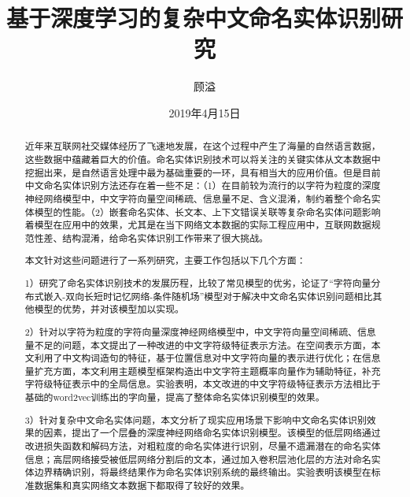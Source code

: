 \documentclass[winfonts,master,oneside,nobackinfo]{njuthesis}
\title{基于深度学习的复杂中文命名实体识别研究}
\author{顾溢}
\institute{南京大学}
\date{2019年4月15日}
\begin{document}

\maketitle
\makeenglishtitle



\begin{abstract}

近年来互联网社交媒体经历了飞速地发展，在这个过程中产生了海量的自然语言数据，这些数据中蕴藏着巨大的价值。命名实体识别技术可以将关注的关键实体从文本数据中挖掘出来，是自然语言处理中最为基础重要的一环，具有相当大的应用价值。但是目前中文命名实体识别方法还存在着一些不足：（1）在目前较为流行的以字符为粒度的深度神经网络模型中，中文字符向量空间稀疏、信息量不足、含义混淆，制约着整个命名实体模型的性能。（2）嵌套命名实体、长文本、上下文错误关联等复杂命名实体问题影响着模型在应用中的效果，尤其是在当下网络文本数据的实际工程应用中，互联网数据规范性差、结构混淆，给命名实体识别工作带来了很大挑战。

本文针对这些问题进行了一系列研究，主要工作包括以下几个方面：

1）研究了命名实体识别技术的发展历程，比较了常见模型的优劣，论证了“字符向量分布式嵌入-双向长短时记忆网络-条件随机场”模型对于解决中文命名实体识别问题相比其他模型的优势，并对该模型加以实现。

2）针对以字符为粒度的字符向量深度神经网络模型中，中文字符向量空间稀疏、信息量不足的问题，本文提出了一种改进的中文字符级特征表示方法。在空间表示方面，本文利用了中文构词造句的特征，基于位置信息对中文字符向量的表示进行优化；在信息量扩充方面，本文利用主题模型框架构造出中文字符主题概率向量作为辅助特征，补充字符级特征表示中的全局信息。实验表明，本文改进的中文字符级特征表示方法相比于基础的word2vec训练出的字向量，提高了整体命名实体识别模型的效果。

3）针对复杂中文命名实体问题，本文分析了现实应用场景下影响中文命名实体识别效果的因素，提出了一个层叠的深度神经网络命名实体识别模型。该模型的低层网络通过改进损失函数和解码方法，对粗粒度的命名实体进行识别，尽量不遗漏潜在的命名实体信息；高层网络接受被低层网络分割后的文本，通过加入卷积层池化层的方法对命名实体边界精确识别，将最终结果作为命名实体识别系统的最终输出。实验表明该模型在标准数据集和真实网络文本数据下都取得了较好的效果。


\end{abstract}
\end{document}
